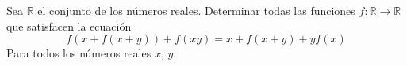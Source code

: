 Sea $\mathbb{R}$ el conjunto de los números reales. Determinar todas las funciones $f : \mathbb{R} \to \mathbb{R}$ que satisfacen la ecuación
\[f\left(x+f(x+y)\right)+f(xy)=x+f(x+y)+yf(x)\]
Para todos los números reales $x$, $y$.